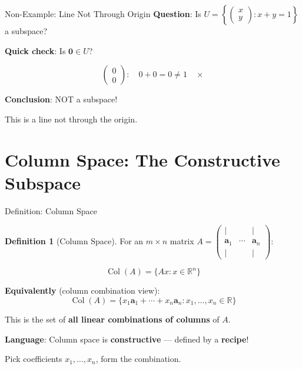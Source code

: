 \documentclass[10pt]{beamer}
\theoremstyle{definition}
\newtheorem{defi}{Definition}[section]
\newcommand{\x}[1]{\alert{\textbf{#1}}}
\begin{document}
\begin{frame}{Non-Example: Line Not Through Origin}
\textbf{Question}: Is $U = \left\{ \begin{pmatrix} x \\ y \end{pmatrix} : x + y = 1 \right\}$ a subspace?

\vfill
\x{Quick check}: Is $\mathbf{0} \in U$?

$$\begin{pmatrix} 0 \\ 0 \end{pmatrix}: \quad 0 + 0 = 0 \neq 1 \quad \times$$

\vfill
\x{Conclusion}: NOT a subspace!

This is a line not through the origin.
\end{frame}

\section{Column Space: The Constructive Subspace}

\begin{frame}{Definition: Column Space}
\begin{defi}[Column Space]
For an $m \times n$ matrix $A = \begin{pmatrix} | & & | \\ \mathbf{a}_1 & \cdots & \mathbf{a}_n \\ | & & | \end{pmatrix}$:

$$\operatorname{Col}(A) = \{ Ax : x \in \mathbb{R}^n \}$$

\textbf{Equivalently} (column combination view):
$$\operatorname{Col}(A) = \{ x_1 \mathbf{a}_1 + \cdots + x_n \mathbf{a}_n : x_1, \ldots, x_n \in \mathbb{R} \}$$

This is the set of \x{all linear combinations of columns} of $A$.
\end{defi}

\vfill
\x{Language}: Column space is \x{constructive} — defined by a \x{recipe}!

Pick coefficients $x_1, \ldots, x_n$, form the combination.
\end{frame}
\end{document}
